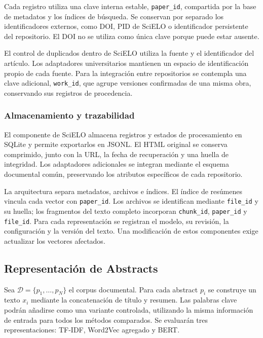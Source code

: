 \documentclass[conference]{IEEEtran}
\begin{document}
Cada registro utiliza una clave interna estable, \texttt{paper\_id}, compartida por la base de metadatos y los índices de búsqueda. Se conservan por separado los identificadores externos, como DOI, PID de SciELO o identificador persistente del repositorio. El DOI no se utiliza como única clave porque puede estar ausente.

El control de duplicados dentro de SciELO utiliza la fuente y el identificador del artículo. Los adaptadores universitarios mantienen un espacio de identificación propio de cada fuente. Para la integración entre repositorios se contempla una clave adicional, \texttt{work\_id}, que agrupe versiones confirmadas de una misma obra, conservando sus registros de procedencia. 

\subsubsection{Almacenamiento y trazabilidad}

El componente de SciELO almacena registros y estados de procesamiento en SQLite y permite exportarlos en JSONL. El HTML original se conserva comprimido, junto con la URL, la fecha de recuperación y una huella de integridad. Los adaptadores adicionales se integran mediante el esquema documental común, preservando los atributos específicos de cada repositorio.

La arquitectura separa metadatos, archivos e índices. El índice de resúmenes vincula cada vector con \texttt{paper\_id}. Los archivos se identifican mediante \texttt{file\_id} y su huella; los fragmentos del texto completo incorporan \texttt{chunk\_id}, \texttt{paper\_id} y \texttt{file\_id}. Para cada representación se registran el modelo, su revisión, la configuración y la versión del texto. Una modificación de estos componentes exige actualizar los vectores afectados.



\subsection{Representación de Abstracts}
\label{subsec:representacion}

Sea $\mathcal{D}=\{p_1,\ldots,p_N\}$ el corpus documental. Para cada abstract $p_i$ se construye un texto $x_i$ mediante la concatenación de título y resumen. Las palabras clave podrán añadirse como una variante controlada, utilizando la misma información de entrada para todos los métodos comparados. Se evaluarán tres representaciones: TF-IDF, Word2Vec agregado y BERT.
\end{document}
